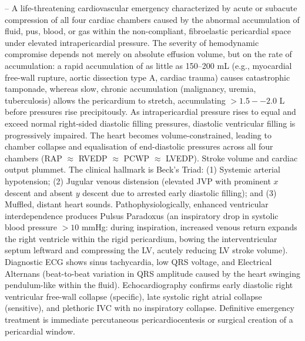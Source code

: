 -- A life-threatening cardiovascular emergency characterized by acute or subacute compression of all four cardiac chambers caused by the abnormal accumulation of fluid, pus, blood, or gas within the non-compliant, fibroelastic pericardial space under elevated intrapericardial pressure. The severity of hemodynamic compromise depends not merely on absolute effusion volume, but on the rate of accumulation: a rapid accumulation of as little as 150--200 mL (e.g., myocardial free-wall rupture, aortic dissection type A, cardiac trauma) causes catastrophic tamponade, whereas slow, chronic accumulation (malignancy, uremia, tuberculosis) allows the pericardium to stretch, accumulating $>1.5--2.0$ L before pressures rise precipitously. As intrapericardial pressure rises to equal and exceed normal right-sided diastolic filling pressures, diastolic ventricular filling is progressively impaired. The heart becomes volume-constrained, leading to chamber collapse and equalisation of end-diastolic pressures across all four chambers (RAP $\approx$ RVEDP $\approx$ PCWP $\approx$ LVEDP). Stroke volume and cardiac output plummet. The clinical hallmark is Beck's Triad: (1) Systemic arterial hypotension; (2) Jugular venous distension (elevated JVP with prominent $x$ descent and absent $y$ descent due to arrested early diastolic filling); and (3) Muffled, distant heart sounds. Pathophysiologically, enhanced ventricular interdependence produces Pulsus Paradoxus (an inspiratory drop in systolic blood pressure $>10$ mmHg: during inspiration, increased venous return expands the right ventricle within the rigid pericardium, bowing the interventricular septum leftward and compressing the LV, acutely reducing LV stroke volume). Diagnostic ECG shows sinus tachycardia, low QRS voltage, and Electrical Alternans (beat-to-beat variation in QRS amplitude caused by the heart swinging pendulum-like within the fluid). Echocardiography confirms early diastolic right ventricular free-wall collapse (specific), late systolic right atrial collapse (sensitive), and plethoric IVC with no inspiratory collapse. Definitive emergency treatment is immediate percutaneous pericardiocentesis or surgical creation of a pericardial window.

